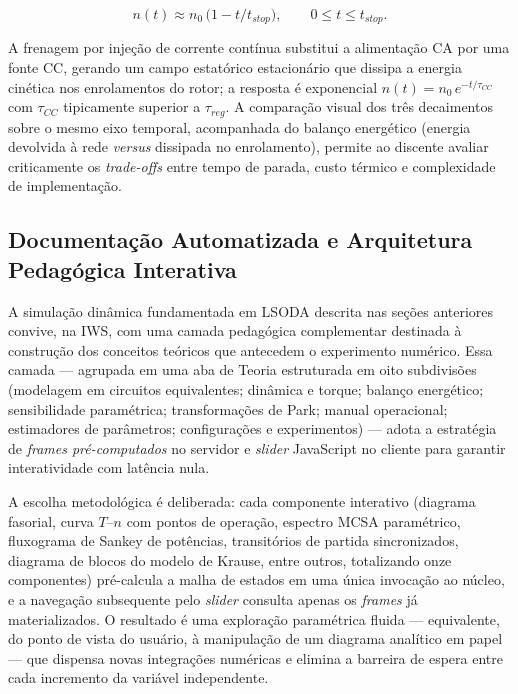 \documentclass[a4paper]{ifacconf}
\begin{document}
\begin{equation}
\label{eq:plugging}
n(t) \approx n_0\,\bigl(1 - t/t_{stop}\bigr), \qquad 0 \leq t \leq t_{stop}.
\end{equation}

A frenagem por injeção de corrente contínua substitui a alimentação CA por uma fonte CC, gerando um campo estatórico estacionário que dissipa a energia cinética nos enrolamentos do rotor; a resposta é exponencial $n(t) = n_0\,e^{-t/\tau_{CC}}$ com $\tau_{CC}$ tipicamente superior a $\tau_{reg}$. A comparação visual dos três decaimentos sobre o mesmo eixo temporal, acompanhada do balanço energético (energia devolvida à rede \textit{versus} dissipada no enrolamento), permite ao discente avaliar criticamente os \textit{trade-offs} entre tempo de parada, custo térmico e complexidade de implementação.

\subsection{Documentação Automatizada e Arquitetura Pedagógica Interativa}
\label{subsec:pedagogica}

A simulação dinâmica fundamentada em LSODA descrita nas seções anteriores convive, na IWS, com uma camada pedagógica complementar destinada à construção dos conceitos teóricos que antecedem o experimento numérico. Essa camada --- agrupada em uma aba de Teoria estruturada em oito subdivisões (modelagem em circuitos equivalentes; dinâmica e torque; balanço energético; sensibilidade paramétrica; transformações de Park; manual operacional; estimadores de parâmetros; configurações e experimentos) --- adota a estratégia de \textit{frames pré-computados} no servidor e \textit{slider} JavaScript no cliente para garantir interatividade com latência nula.

A escolha metodológica é deliberada: cada componente interativo (diagrama fasorial, curva $T$--$n$ com pontos de operação, espectro MCSA paramétrico, fluxograma de Sankey de potências, transitórios de partida sincronizados, diagrama de blocos do modelo de Krause, entre outros, totalizando onze componentes) pré-calcula a malha de estados em uma única invocação ao núcleo, e a navegação subsequente pelo \textit{slider} consulta apenas os \textit{frames} já materializados. O resultado é uma exploração paramétrica fluida --- equivalente, do ponto de vista do usuário, à manipulação de um diagrama analítico em papel --- que dispensa novas integrações numéricas e elimina a barreira de espera entre cada incremento da variável independente.
\end{document}
